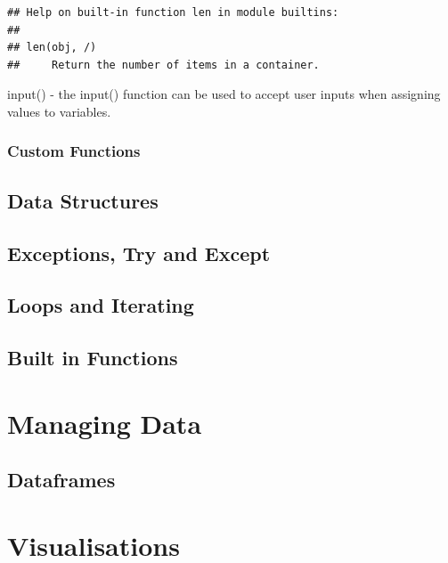 \documentclass[
]{book}
\begin{document}
\begin{verbatim}
## Help on built-in function len in module builtins:
## 
## len(obj, /)
##     Return the number of items in a container.
\end{verbatim}

input() - the input() function can be used to accept user inputs when assigning values to variables.

\hypertarget{custom-functions}{%
\subsubsection{Custom Functions}\label{custom-functions}}

\hypertarget{data-structures}{%
\subsection{Data Structures}\label{data-structures}}

\hypertarget{exceptions-try-and-except}{%
\subsection{Exceptions, Try and Except}\label{exceptions-try-and-except}}

\hypertarget{loops-and-iterating}{%
\subsection{Loops and Iterating}\label{loops-and-iterating}}

\hypertarget{built-in-functions}{%
\subsection{Built in Functions}\label{built-in-functions}}

\hypertarget{managing-data}{%
\section{Managing Data}\label{managing-data}}

\hypertarget{dataframes}{%
\subsection{Dataframes}\label{dataframes}}

\hypertarget{visualisations}{%
\section{Visualisations}\label{visualisations}}
\end{document}
